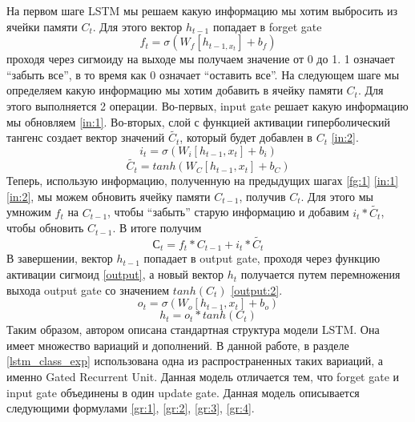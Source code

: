     На первом шаге LSTM мы решаем какую информацию мы хотим выбросить из ячейки памяти $C_{t}$. Для этого вектор $h_{t-1}$ попадает в forget gate
    \begin{equation}\label{fg:1}
    f_{t} = \sigma(W_{f}[h_{t-1,x_{t}}]+b_{f})
    \end{equation}
    проходя через сигмоиду на выходе мы получаем значение от 0 до 1. 1 означает ``забыть все'', в то время как 0 означает ``оставить все''.
    На следующем шаге мы определяем какую информацию мы хотим добавить в ячейку памяти $C_{t}$. Для этого выполняется 2 операции. Во-первых, input gate решает какую информацию мы обновляем \ref{in:1}. Во-вторых, слой с функцией активации гиперболический тангенс создает вектор значений $\tilde{C_{t}}$, который будет добавлен в $C_{t}$ \ref{in:2}.
    \begin{equation}\label{in:1}
    i_{t}=\sigma(W_{i}[h_{t-1},x_{t}]+b_{i})
    \end{equation}
    \begin{equation}\label{in:2}
    \tilde{C_{t}} = tanh(W_{C}[h_{t-1},x_{t}]+b_{C})
    \end{equation}
    Теперь, использую информацию, полученную на предыдущих шагах \ref{fg:1} \ref{in:1} \ref{in:2}, мы можем обновить ячейку памяти $C_{t-1}$, получив $C_{t}$. Для этого мы умножим $f_{t}$ на $C_{t-1}$, чтобы ``забыть'' старую информацию и добавим $i_{t}*\tilde{C_{t}}$, чтобы обновить $C_{t-1}$. В итоге получим
    \begin{equation}\label{update}
    С_{t}=f_{t}*C_{t-1}+i_{t}*\tilde{C_{t}}
    \end{equation}
    В завершении, вектор $h_{t-1}$ попадает в output gate, проходя через функцию активации сигмоид \ref{output}, а новый вектор $h_{t}$ получается путем перемножения выхода output gate со значением $tanh(C_{t})$ \ref{output:2}.
    \begin{equation}\label{output}
    o_{t}=\sigma(W_{o}[h_{t-1},x_{t}]+b_{o})
    \end{equation}
    \begin{equation}\label{output:2}
    h_{t}=o_{t}*tanh(C_{t})
    \end{equation}
    Таким образом, автором описана стандартная структура модели LSTM. Она имеет множество вариаций и дополнений. В данной работе, в разделе \ref{lstm_class_exp} использована одна из распространенных таких вариаций, а именно Gated Recurrent Unit. Данная модель отличается тем, что forget gate и input gate объединены в один update gate. Данная модель описывается следующими формулами \ref{gr:1}, \ref{gr:2}, \ref{gr:3}, \ref{gr:4}.
